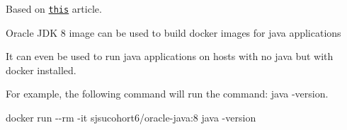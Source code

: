 Based on \href{https://runnable.com/docker/java/dockerize-your-java-application}{\tt this} article.

Oracle J\+DK 8 image can be used to build docker images for java applications

It can even be used to run java applications on hosts with no java but with docker installed.

For example, the following command will run the command\+: java -\/version.

{\ttfamily docker run -\/-\/rm -\/it sjsucohort6/oracle-\/java\+:8 java -\/version} 